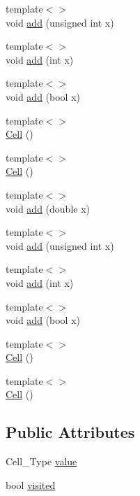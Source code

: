 \begin{DoxyCompactItemize}
\item 
{\footnotesize template$<$$>$ }\\void \hyperlink{class_cell_ae22060201cf692bbf219827453d0acd2}{add} (unsigned int x)
\item 
{\footnotesize template$<$$>$ }\\void \hyperlink{class_cell_a74cb069c7341de33354c396465818c2f}{add} (int x)
\item 
{\footnotesize template$<$$>$ }\\void \hyperlink{class_cell_a0da6d3d39069cc22486442cc51c7685c}{add} (bool x)
\item 
{\footnotesize template$<$$>$ }\\\hyperlink{class_cell_a5ecdaddaf4661a9a8fe6f0ed61595847}{Cell} ()
\item 
{\footnotesize template$<$$>$ }\\\hyperlink{class_cell_aef4b64101b33e2349ceea132b962d137}{Cell} ()
\item 
{\footnotesize template$<$$>$ }\\void \hyperlink{class_cell_a64d4b92f322ccb8cfbad53f816d2caf8}{add} (double x)
\item 
{\footnotesize template$<$$>$ }\\void \hyperlink{class_cell_ae22060201cf692bbf219827453d0acd2}{add} (unsigned int x)
\item 
{\footnotesize template$<$$>$ }\\void \hyperlink{class_cell_a74cb069c7341de33354c396465818c2f}{add} (int x)
\item 
{\footnotesize template$<$$>$ }\\void \hyperlink{class_cell_a0da6d3d39069cc22486442cc51c7685c}{add} (bool x)
\item 
{\footnotesize template$<$$>$ }\\\hyperlink{class_cell_a5ecdaddaf4661a9a8fe6f0ed61595847}{Cell} ()
\item 
{\footnotesize template$<$$>$ }\\\hyperlink{class_cell_aef4b64101b33e2349ceea132b962d137}{Cell} ()
\end{DoxyCompactItemize}
\subsection*{Public Attributes}
\begin{DoxyCompactItemize}
\item 
Cell\+\_\+\+Type \hyperlink{class_cell_a5df1609bc0705830ec4dc6e177ddc955}{value}
\item 
bool \hyperlink{class_cell_a1f539a05953fa05d723c32e718f0eeb3}{visited}
\end{DoxyCompactItemize}


